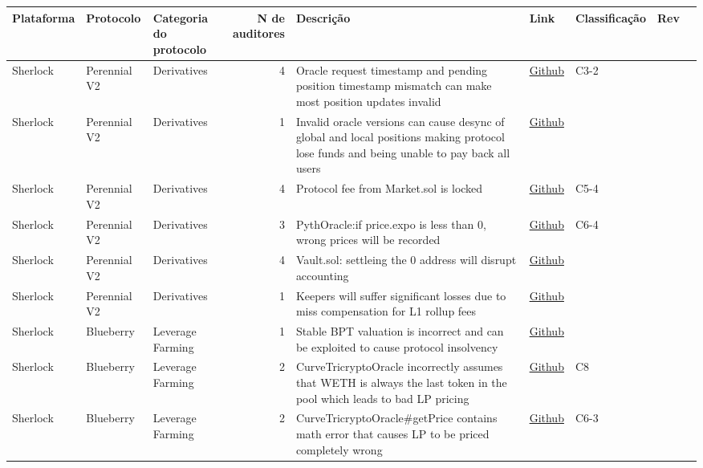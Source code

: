 \documentclass[11pt]{article}
\begin{document}
\begin{center}
\begin{tabular}{lllrlllll}
Plataforma & Protocolo & Categoria do protocolo & N de auditores & Descrição & Link & Classificação & Rev & \\[0pt]
\hline
Sherlock & Perennial V2 & Derivatives & 4 & Oracle request timestamp and pending position timestamp mismatch can make most position updates invalid & \href{https://github.com/sherlock-audit/2023-07-perennial-judging/issues/42}{Github} & C3-2 &  & \\[0pt]
Sherlock & Perennial V2 & Derivatives & 1 & Invalid oracle versions can cause desync of global and local positions making protocol lose funds and being unable to pay back all users & \href{https://github.com/sherlock-audit/2023-07-perennial-judging/issues/49}{Github} &  &  & \\[0pt]
Sherlock & Perennial V2 & Derivatives & 4 & Protocol fee from Market.sol is locked & \href{https://github.com/sherlock-audit/2023-07-perennial-judging/issues/52}{Github} & C5-4 &  & \\[0pt]
Sherlock & Perennial V2 & Derivatives & 3 & PythOracle:if price.expo is less than 0, wrong prices will be recorded & \href{https://github.com/sherlock-audit/2023-07-perennial-judging/issues/56}{Github} & C6-4 &  & \\[0pt]
Sherlock & Perennial V2 & Derivatives & 4 & Vault.sol: settleing the 0 address will disrupt accounting & \href{https://github.com/sherlock-audit/2023-07-perennial-judging/issues/62}{Github} &  &  & \\[0pt]
Sherlock & Perennial V2 & Derivatives & 1 & Keepers will suffer significant losses due to miss compensation for L1 rollup fees & \href{https://github.com/sherlock-audit/2023-07-perennial-judging/issues/91}{Github} &  &  & \\[0pt]
Sherlock & Blueberry & Leverage Farming & 1 & Stable BPT valuation is incorrect and can be exploited to cause protocol insolvency & \href{https://github.com/sherlock-audit/2023-07-blueberry-judging/issues/97}{Github} &  &  & \\[0pt]
Sherlock & Blueberry & Leverage Farming & 2 & CurveTricryptoOracle incorrectly assumes that WETH is always the last token in the pool which leads to bad LP pricing & \href{https://github.com/sherlock-audit/2023-07-blueberry-judging/issues/98}{Github} & C8 &  & \\[0pt]
Sherlock & Blueberry & Leverage Farming & 2 & CurveTricryptoOracle\#getPrice contains math error that causes LP to be priced completely wrong & \href{https://github.com/sherlock-audit/2023-07-blueberry-judging/issues/100}{Github} & C6-3 &  & \\[0pt]

\end{tabular}
\end{center}
\end{document}

